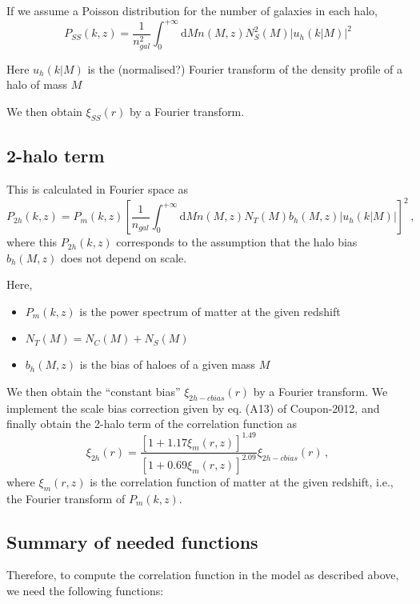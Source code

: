 \documentclass[10pt,a4paper]{article}
\begin{document}
If we assume a Poisson distribution for the number of galaxies in each halo,
\begin{equation}
P_{SS}(k,z) = \frac{1}{n_{gal}^2}\int_0^{+\infty} \mathrm{d}M n(M,z) N_S^2(M) \left| u_h(k|M)\right|^2
\end{equation}

Here $u_h(k|M)$ is the (normalised?) Fourier transform of the density profile of a halo of mass $M$

We then obtain $\xi_{SS}(r)$ by a Fourier transform.

\subsection{2-halo term}

This is calculated in Fourier space as
\begin{equation}
P_{2h}(k,z) = P_m(k,z)\left[ \frac{1}{n_{gal}} \int_0^{+\infty} \mathrm{d}M n(M,z) N_T(M) b_h(M,z) \left| u_h(k|M)\right| \right]^2 \, ,
\end{equation}
where this $P_{2h}(k,z)$ corresponds to the assumption that the halo bias $b_h(M,z)$ does not depend on scale.

Here,
\begin{itemize}
\item $P_m(k,z)$ is the power spectrum of matter at the given redshift
\item $N_T(M) = N_C(M) + N_S(M)$
\item $b_h(M,z)$ is the bias of haloes of a given mass $M$
\end{itemize}

We then obtain the ``constant bias'' $\xi_{2h-cbias}(r)$ by a Fourier transform. 
We implement the scale bias correction given by eq. (A13) of Coupon-2012, and finally obtain the 2-halo term of the correlation function as
\begin{equation}
  \label{eq:1}
  \xi_{2h}(r) = \frac{\left[ 1 + 1.17 \xi_m(r,z)\right]^{1.49}}{\left[ 1 + 0.69 \xi_m(r,z)\right]^{2.09}} \xi_{2h-cbias}(r) \, , 
\end{equation}
where $\xi_m(r,z)$ is the correlation function of matter at the given redshift, i.e., the Fourier transform of $P_m(k,z)$.

\subsection{Summary of needed functions}

Therefore, to compute the correlation function in the model as described above, we need the following functions:
\end{document}
